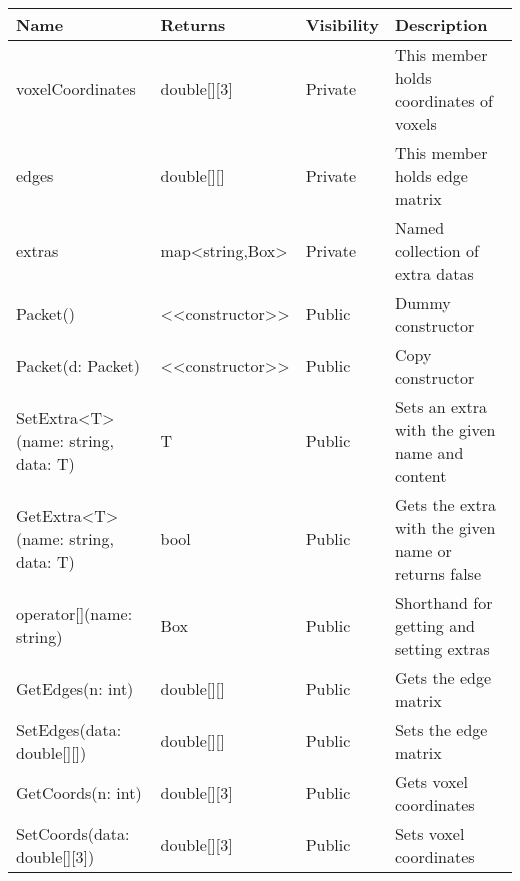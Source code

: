 \begin{center}
	\\[0.8cm]
	\begin{tabular}{|p{4.5cm}|p{3cm}|p{1.5cm}|p{5cm}|}
		\hline 
			Name & Returns & Visibility & Description \\
		\hline 
			voxelCoordinates & double[][3] & Private & This member holds coordinates of voxels \\
		\hline 
			edges & double[][] & Private & This member holds edge matrix \\
		\hline
			extras & map<string,Box> & Private & Named collection of extra datas \\
		\hline
			Packet() & <<constructor>> & Public & Dummy constructor \\
		\hline
			Packet(d: Packet) & <<constructor>> & Public & Copy constructor \\
		\hline
			SetExtra<T>(name: string, data: T) & T & Public & Sets an extra with the given name and content \\
		\hline
			GetExtra<T>(name: string, data: T) & bool & Public & Gets the extra with the given name or returns false \\
		\hline
			operator[](name: string) & Box & Public & Shorthand for getting and setting extras \\
		\hline
			GetEdges(n: int) & double[][] & Public & Gets the edge matrix \\
		\hline
			SetEdges(data: double[][]) & double[][] & Public & Sets the edge matrix \\
		\hline
			GetCoords(n: int) & double[][3] & Public & Gets voxel coordinates \\
		\hline
			SetCoords(data: double[][3]) & double[][3] & Public & Sets voxel coordinates \\
		\hline
	\end{tabular}
\end{center}

